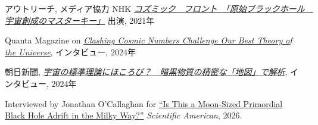 \begin{rSection}{アウトリーチ, メディア協力}
  NHK \href{https://www.nhk-ondemand.jp/goods/G2021114366SA000/}{\textit{コズミック　フロント　「原始ブラックホール　宇宙創成のマスターキー」}} 出演, 2021年

  Quanta Magazine on \href{https://www.quantamagazine.org/clashing-cosmic-numbers-challenge-our-best-theory-of-the-universe-20240119/}{\textit{Clashing Cosmic Numbers Challenge Our Best Theory of the Universe}}, インタビュー, 2024年
  
  朝日新聞, \href{https://www.asahi.com/articles/ASR4H415RR48ULBH001.html}{\textit{宇宙の標準理論にほころび？　暗黒物質の精密な「地図」で解析}}, インタビュー, 2024年

  Interviewed by Jonathan O'Callaghan for \href{https://www.scientificamerican.com/article/did-we-just-see-a-primordial-black-hole-at-the-milky-ways-edge/}{``Is This a Moon-Sized Primordial Black Hole Adrift in the Milky Way?''} \textit{Scientific American}, 2026.
\end{rSection}
